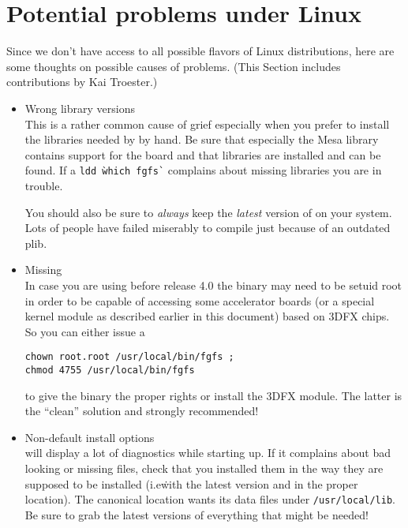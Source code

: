 \section{Potential problems under Linux}
Since we don't have access to all possible flavors of Linux distributions, here are some
thoughts on possible causes of problems. (This Section includes contributions by Kai
Troester.)

\begin{itemize}

\item{Wrong library versions}\\
  This is a rather common cause of grief especially when you prefer to
  install the libraries needed by \FlightGear{} by hand. Be sure that
  especially the Mesa library contains support for the
   board and that  libraries are installed and can be
  found. If a \texttt{ldd \`which fgfs\`} complains about missing
  libraries you are in trouble.

  You should also be sure to \emph{always} keep the \emph{latest} version
  of \PLIB{} on your system. Lots of people have
  failed miserably to compile \FlightGear{} just because of an outdated
  plib.


\item{Missing }\\
 In case you are using  before release 4.0 the \FlightGear{} binary may need to be  setuid root in order to be capable of  accessing some accelerator boards (or a special kernel module as described earlier in this document) based on 3DFX chips.
  So you can either issue a

  \texttt{chown root.root /usr/local/bin/fgfs ;}\\
  \texttt{chmod 4755 /usr/local/bin/fgfs}

  to give the \FlightGear{} binary the proper rights or install
  the 3DFX module. The latter is the ``clean''
  solution and strongly recommended!


\item{Non-default install options}\\
  \FlightGear{} will display a lot of diagnostics while starting up.
  If it complains about bad looking or missing files, check that you
  installed them in the way they are supposed to be installed (i.e\. with the latest
  version and in the proper location). The canonical location \FlightGear{}
  wants its data files under \texttt{/usr/local/lib}.
   Be sure to grab the latest versions of everything that might be needed!


\end{itemize}
